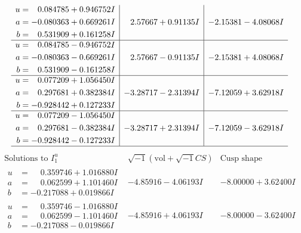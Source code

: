 \documentclass[1p]{elsarticle_modified}
\theoremstyle{definition}
\newcommand{\I}{\sqrt{-1}}
\begin{document}
$$\begin{array}{c|c|c}
\begin{aligned}
u &= \phantom{-}0.084785 + 0.946752 I \\
a &= -0.080363 + 0.669261 I \\
b &= \phantom{-}0.531909 + 0.161258 I\end{aligned}
 & \phantom{-}2.57667 + 0.91135 I & -2.15381 - 4.08068 I \\ \hline\begin{aligned}
u &= \phantom{-}0.084785 - 0.946752 I \\
a &= -0.080363 - 0.669261 I \\
b &= \phantom{-}0.531909 - 0.161258 I\end{aligned}
 & \phantom{-}2.57667 - 0.91135 I & -2.15381 + 4.08068 I \\ \hline\begin{aligned}
u &= \phantom{-}0.077209 + 1.056450 I \\
a &= \phantom{-}0.297681 + 0.382384 I \\
b &= -0.928442 + 0.127233 I\end{aligned}
 & -3.28717 - 2.31394 I & -7.12059 + 3.62918 I \\ \hline\begin{aligned}
u &= \phantom{-}0.077209 - 1.056450 I \\
a &= \phantom{-}0.297681 - 0.382384 I \\
b &= -0.928442 - 0.127233 I\end{aligned}
 & -3.28717 + 2.31394 I & -7.12059 - 3.62918 I\\
 \hline 
 \end{array}$$\newpage$$\begin{array}{c|c|c}  
\text{Solutions to }I^u_{1}& \I (\text{vol} + \sqrt{-1}CS) & \text{Cusp shape}\\
 \hline 
\begin{aligned}
u &= \phantom{-}0.359746 + 1.016880 I \\
a &= \phantom{-}0.062599 + 1.101460 I \\
b &= -0.217088 + 0.019866 I\end{aligned}
 & -4.85916 - 4.06193 I & -8.00000 + 3.62400 I \\ \hline\begin{aligned}
u &= \phantom{-}0.359746 - 1.016880 I \\
a &= \phantom{-}0.062599 - 1.101460 I \\
b &= -0.217088 - 0.019866 I\end{aligned}
 & -4.85916 + 4.06193 I & -8.00000 - 3.62400 I \\ \hline\begin{aligned}

\end{aligned}
\end{array}$$
\end{document}
